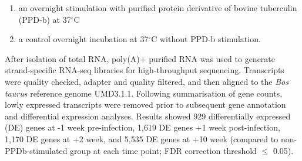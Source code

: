 \documentclass[11pt, a4paper]{article}
\providecommand{\tightlist}{%
  \setlength{\itemsep}{0pt}\setlength{\parskip}{0pt}}
\begin{document}
\begin{enumerate}
\def\labelenumi{\alph{enumi}.}
\tightlist
\item
  an overnight stimulation with purified protein derivative of bovine
  tuberculin (PPD-b) at 37\(^\circ\)C
\item
  a control overnight incubation at 37\(^\circ\)C without PPD-b
  stimulation.
\end{enumerate}

After isolation of total RNA, poly(A)+ purified RNA was used to generate
strand-specific RNA-seq libraries for high-throughput sequencing.
Transcripts were quality checked, adapter and quality filtered, and then
aligned to the \emph{Bos taurus} reference genome UMD3.1.1. Following
summarisation of gene counts, lowly expressed transcripts were removed
prior to subsequent gene annotation and differential expression
analyses. Results showed 929 differentially expressed (DE) genes at -1
week pre-infection, 1,619 DE genes +1 week post-infection, 1,170 DE
genes at +2 week, and 5,535 DE genes at +10 week (compared to
non-PPDb-stimulated group at each time point; FDR correction threshold
\(\leq\) 0.05).
\end{document}

